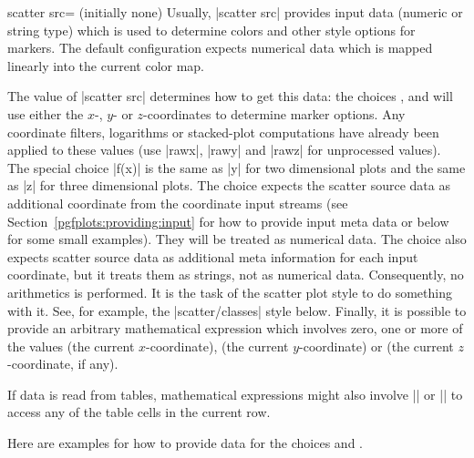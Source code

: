{\begin{pgfplotskey}{scatter src= (initially none)%
}
    Usually, |scatter src| provides input data (numeric or string type) which
    is used to determine colors and other style options for markers. The
    default configuration expects numerical data which is mapped linearly into
    the current color map.

    The value of |scatter src| determines how to get this data: the choices
    ,  and  will use either the
    $x$-, $y$- or $z$-coordinates to determine marker options. Any coordinate
    filters, logarithms or stacked-plot computations have already been applied
    to these values (use |rawx|, |rawy| and |rawz| for unprocessed values). The
    special choice |f(x)| is the same as |y| for two dimensional plots and the
    same as |z| for three dimensional plots. The choice 
    expects the scatter source data as additional coordinate from the
    coordinate input streams (see Section~\ref{pgfplots:providing:input} for
    how to provide input meta data or below for some small examples). They will
    be treated as numerical data. The choice 
    also expects scatter source data as additional meta information for each
    input coordinate, but it treats them as strings, not as numerical data.
    Consequently, no arithmetics is performed. It is the task of the scatter
    plot style to do something with it. See, for example, the |scatter/classes|
    style below. Finally, it is possible to provide an arbitrary mathematical
    expression which involves zero, one or more of the values 
    (the current $x$-coordinate),  (the current $y$-coordinate)
    or  (the current $z$-coordinate, if any).

    If data is read from tables, mathematical expressions might also involve
    |\thisrow| or |\thisrowno| to access
    any of the table cells in the current row.

    Here are examples for how to provide data for the choices
     and .
\begin{codeexample}
\end{codeexample}
\end{pgfplotskey}}
